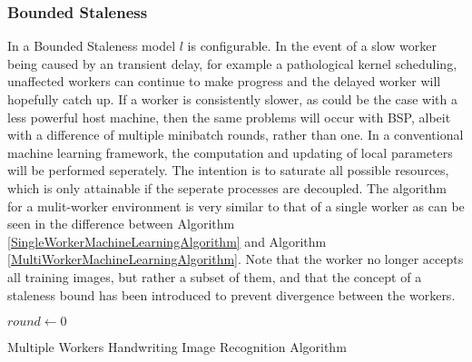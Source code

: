 \documentclass[12pt]{article}
\begin{document}
\subsubsection{Bounded Staleness}
In a Bounded Staleness model $l$ is configurable. In the event of a slow worker being caused by an transient delay, for example a pathological kernel scheduling, unaffected workers can continue to make progress and the delayed worker will hopefully catch up. If a worker is consistently slower, as could be the case with a less powerful host machine, then the same problems will occur with BSP, albeit with a difference of multiple minibatch rounds, rather than one.
\newline
\newline
In a conventional machine learning framework, the computation and updating of local parameters will be performed seperately. The intention is to saturate all possible resources, which is only attainable if the seperate processes are decoupled.
\newline
\newline
The algorithm for a mulit-worker environment is very similar to that of a single worker as can be seen in the difference between Algorithm \ref{SingleWorkerMachineLearningAlgorithm} and Algorithm \ref{MultiWorkerMachineLearningAlgorithm}. Note that the worker no longer accepts all training images, but rather a subset of them, and that the concept of a staleness bound has been introduced to prevent divergence between the workers.

\IncMargin{1em}
\begin{algorithm}[H]
 \BlankLine

 $round \longleftarrow 0$\;
 \caption{Multiple Workers Handwriting Image Recognition Algorithm}
 \label{MultiWorkerMachineLearningAlgorithm}
\end{algorithm}
\DecMargin{1em}
\end{document}
